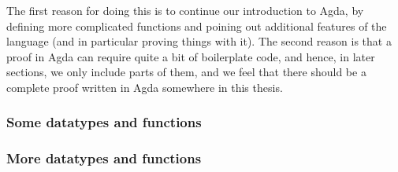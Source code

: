 The first reason for doing this is to continue our introduction to Agda, by defining more complicated functions and poining out additional features of the language (and in particular proving things with it). The second reason is that a proof in Agda can require quite a bit of boilerplate code, and hence, in later sections, we only include parts of them, and we feel that there should be a complete proof written in Agda somewhere in this thesis.
\subsubsection{Some datatypes and functions}


\subsubsection{More datatypes and functions}
